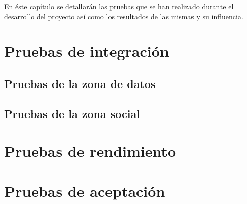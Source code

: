 En éste capítulo se detallarán las pruebas que se han realizado durante el desarrollo del proyecto así como los resultados de las mismas y su influencia.


\section{Pruebas de integración}
\label{pruebas:integracion}
	
	
	\subsection{Pruebas de la zona de datos}
	\label{pruebas:integracion:zona_datos}
	
	
	
	\subsection{Pruebas de la zona social}
	\label{pruebas:integracion:zona_social}
	


\section{Pruebas de rendimiento}
\label{pruebas:rendimiento}



\section{Pruebas de aceptación}
\label{pruebas:aceptacion}
